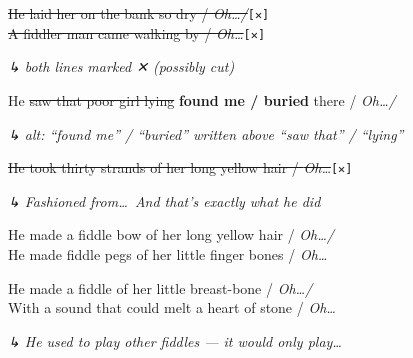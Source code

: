 \documentclass[11pt, a4paper]{article}
\newcommand{\struck}[1]{{\color{strikegray}\sout{#1}}}
\newcommand{\ins}[1]{{\bfseries #1}}
\newcommand{\cutline}[1]{%
  {\color{strikegray}\sout{#1}\enspace\texttt{\scriptsize[✕]}}%
}
\newenvironment{verse}%
  {\vspace{0.6em}\noindent}%
  {\vspace{0.6em}}
\newenvironment{annotation}%
  {\par\noindent\hspace{1em}\begin{minipage}{0.85\linewidth}%
   \ttfamily\small\color{annotred}\itshape ↳\enspace\ignorespaces}%
  {\end{minipage}\par}
\begin{document}
\hrulefill

\begin{verse}
\begin{bracketgroup}
\cutline{He laid her on the bank so dry / \textit{Oh\ldots /}}\\
\cutline{A fiddler man came walking by / \textit{Oh\ldots}}
\end{bracketgroup}
\begin{annotation}
both lines marked ✕ (possibly cut)
\end{annotation}
\end{verse}

\hrulefill

\begin{verse}
\begin{bracketgroup}
He \struck{saw that poor girl lying} \ins{found me / buried} there / \textit{Oh\ldots /}
\begin{annotation}
alt: ``found me'' / ``buried'' written above ``saw that'' / ``lying''
\end{annotation}
\cutline{He took thirty strands of her long yellow hair / \textit{Oh\ldots}}
\begin{annotation}
Fashioned from\ldots\ And that's exactly what he did
\end{annotation}
\end{bracketgroup}
\end{verse}

\hrulefill

\begin{verse}
\begin{bracketgroup}
He made a fiddle bow of her long yellow hair / \textit{Oh\ldots /}\\
He made fiddle pegs of her little finger bones / \textit{Oh\ldots}
\end{bracketgroup}
\end{verse}

\hrulefill

\begin{verse}
\begin{bracketgroup}
He made a fiddle of her little breast-bone / \textit{Oh\ldots /}\\
With a sound that could melt a heart of stone / \textit{Oh\ldots}
\begin{annotation}
He used to play other fiddles — it would only play\ldots
\end{annotation}
\end{bracketgroup}
\end{verse}
\end{document}
